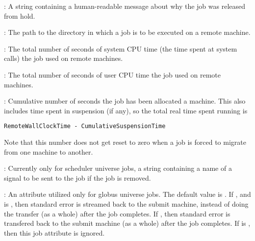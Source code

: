 \begin{description}
\item[\AdAttr{ReleaseReason}] :    A string containing a human-readable
message about why the job was released from hold.

\item[\AdAttr{RemoteIwd}] : The path to the directory in which
a job is to be executed on a remote machine.

\item[\AdAttr{RemoteSysCpu}] : The total number of seconds
of system CPU time (the time spent at system calls) the job used
on remote machines.

\item[\AdAttr{RemoteUserCpu}] : The total number of seconds
of user CPU time the job used on remote machines.

\item[\AdAttr{RemoteWallClockTime}] : Cumulative number of seconds
the job has been allocated a machine.
This also includes time spent in suspension (if any),
so the total real time spent running is 
\begin{verbatim}
RemoteWallClockTime - CumulativeSuspensionTime
\end{verbatim}
Note that this number does not get reset to
zero when a job is forced to migrate from one machine to another.

\item[\AdAttr{RemoveKillSig}] :   Currently only for scheduler universe jobs,
a string containing a name of
a signal to be sent to the job if the job is removed.

\item[\AdAttr{StreamErr}] :  
An attribute utilized only for globus universe jobs.
The default value is .
If , and  is , then 
standard error is streamed back to the submit machine, instead
of doing the transfer (as a whole) after the job completes.
If , then
standard error is transfered back to the submit machine
(as a whole) after the job completes.
If  is , then this job attribute is ignored.


\end{description}
